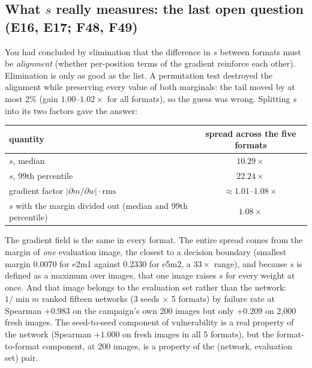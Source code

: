 \subsection{What $s$ really measures: the last open question (E16, E17; F48, F49)}
You had concluded by elimination that the difference in $s$ between formats must be \emph{alignment} (whether per-position terms of the gradient reinforce each other). Elimination is only as good as the list. A permutation test destroyed the alignment while preserving every value of both marginals: the tail moved by at most 2\% (gain $1.00$--$1.02\times$ for all formats), so the guess was wrong.
Splitting $s$ into its two factors gave the answer:
\begin{center}
\small
\begin{tabular}{lc}
\toprule
quantity & spread across the five formats \\
\midrule
$s$, median & $10.29\times$ \\
$s$, 99th percentile & $22.24\times$ \\
gradient factor $|\partial m/\partial w|\cdot\mathrm{rms}$ & $\approx1.01$--$1.08\times$ \\
$s$ with the margin divided out (median and 99th percentile) & \textbf{$1.08\times$} \\
\bottomrule
\end{tabular}
\end{center}
The gradient field is the same in every format. The entire spread comes from the margin of \emph{one} evaluation image, the closest to a decision boundary (smallest margin 0.0070 for e2m1 against 0.2330 for e5m2, a $33\times$ range), and because $s$ is defined as a maximum over images, that one image raises $s$ for every weight at once.
And that image belongs to the evaluation set rather than the network: $1/\min m$ ranked fifteen networks (3 seeds $\times$ 5 formats) by failure rate at Spearman $+0.983$ on the campaign's own 200 images but only $+0.209$ on 2{,}000 fresh images. The seed-to-seed component of vulnerability is a real property of the network (Spearman $+1.000$ on fresh images in all 5 formats),
but the format-to-format component, at 200 images, is a property of the (network, evaluation set) pair.
